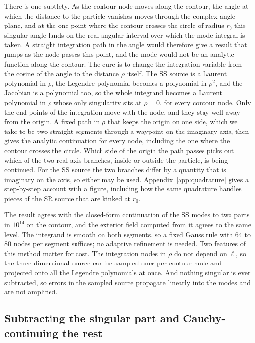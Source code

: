 \documentclass[aps,prd,twocolumn,superscriptaddress,nofootinbib,floatfix]{revtex4-2}
\begin{document}
There is one subtlety.
As the contour node moves along the contour, the angle at which the distance to the particle vanishes moves through the complex angle plane, and at the one point where the contour crosses the circle of radius $r_0$ this singular angle lands on the real angular interval over which the mode integral is taken.
A straight integration path in the angle would therefore give a result that jumps as the node passes this point, and the mode would not be an analytic function along the contour.
The cure is to change the integration variable from the cosine of the angle to the distance $\rho$ itself.
The SS source is a Laurent polynomial in $\rho$, the Legendre polynomial becomes a polynomial in $\rho^2$, and the Jacobian is a polynomial too, so the whole integrand becomes a Laurent polynomial in $\rho$ whose only singularity sits at $\rho=0$, for every contour node.
Only the end points of the integration move with the node, and they stay well away from the origin.
A fixed path in $\rho$ that keeps the origin on one side, which we take to be two straight segments through a waypoint on the imaginary axis, then gives the analytic continuation for every node, including the one where the contour crosses the circle.
Which side of the origin the path passes picks out which of the two real-axis branches, inside or outside the particle, is being continued.
For the SS source the two branches differ by a quantity that is imaginary on the axis, so either may be used.
Appendix~\ref{app:quadrature} gives a step-by-step account with a figure, including how the same quadrature handles pieces of the SR source that are kinked at $r_0$.

The result agrees with the closed-form continuation of the SS modes to two parts in $10^{14}$ on the contour, and the exterior field computed from it agrees to the same level.
The integrand is smooth on both segments, so a fixed Gauss rule with 64 to 80 nodes per segment suffices; no adaptive refinement is needed.
Two features of this method matter for cost.
The integration nodes in $\rho$ do not depend on $\ell$, so the three-dimensional source can be sampled once per contour node and projected onto all the Legendre polynomials at once.
And nothing singular is ever subtracted, so errors in the sampled source propagate linearly into the modes and are not amplified.

\subsection{Subtracting the singular part and Cauchy-continuing the rest}\label{sec:sssub}
\end{document}
